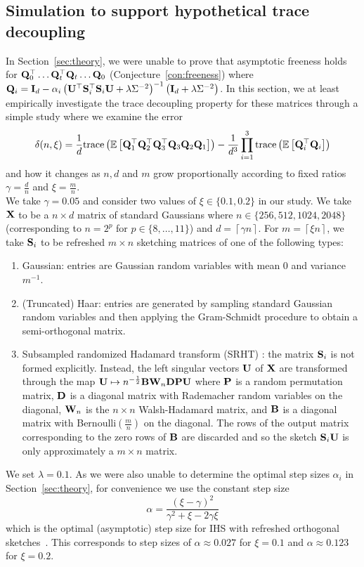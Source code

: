\subsection{Simulation to support hypothetical trace decoupling} \label{sec:empirical}

In Section~\ref{sec:theory}, we were unable to prove that asymptotic freeness holds for $\mathbf{Q}_0^\top\ldots\mathbf{Q}_t^\top\mathbf{Q}_t\ldots\mathbf{Q}_0$ (Conjecture~\ref{con:freeness}) where $\mathbf{Q}_i=\mathbf{I}_d - \alpha_i\left(\mathbf{U}^\top\mathbf{S}_i^\top\mathbf{S}_i\mathbf{U} + \lambda\Sigma^{-2}\right)^{-1}\left(\mathbf{I}_d + \lambda\Sigma^{-2}\right)$. In this section, we at least empirically investigate the trace decoupling property for these matrices through a simple study where we examine the error
\[
\delta(n,\xi) = \frac{1}{d}\mathrm{trace}\left(\mathbb{E}\left[\mathbf{Q}_1^\top\mathbf{Q}_2^\top\mathbf{Q}_3^\top\mathbf{Q}_3\mathbf{Q}_2\mathbf{Q}_1\right]\right) - \frac{1}{d^3}\prod_{i=1}^3\mathrm{trace}\left(\mathbb{E}\left[\mathbf{Q}_i^\top\mathbf{Q}_i\right]\right)
\]
and how it changes as $n,d$ and $m$ grow proportionally according to fixed ratios $\gamma=\frac{d}{n}$ and $\xi=\frac{m}{n}$.
\\

We take $\gamma=0.05$ and consider two values of $\xi\in\{0.1,0.2\}$ in our study. We take $\mathbf{X}$ to be a $n\times d$ matrix of \iid standard Gaussians where $n\in\{256,512,1024,2048\}$ (corresponding to $n=2^p$ for $p\in\{8,\ldots,11\}$) and $d=\left\lceil{\gamma n}\right\rceil$. For $m=\left\lceil{\xi n}\right\rceil$, we take $\mathbf{S}_i$ to be refreshed $m\times n$ sketching matrices of one of the following types:
\begin{enumerate}
\item
\iid Gaussian: entries are \iid Gaussian random variables with mean 0 and variance $m^{-1}$.
\item
(Truncated) Haar: entries are generated by sampling \iid standard Gaussian random variables and then applying the Gram-Schmidt procedure to obtain a semi-orthogonal matrix.
\item
Subsampled randomized Hadamard transform (SRHT) \citep{Lacotte:2020}: the matrix $\mathbf{S}_i$ is not formed explicitly. Instead, the left singular vectors $\mathbf{U}$ of $\mathbf{X}$ are transformed through the map $\mathbf{U}\mapsto n^{-\frac{1}{2}}\mathbf{B}\mathbf{W}_n\mathbf{D}\mathbf{P}\mathbf{U}$ where $\mathbf{P}$ is a random permutation matrix, $\mathbf{D}$ is a diagonal matrix with Rademacher random variables on the diagonal, $\mathbf{W}_n$ is the $n\times n$ Walsh-Hadamard matrix, and $\mathbf{B}$ is a diagonal matrix with Bernoulli$\left(\frac{m}{n}\right)$ on the diagonal. The rows of the output matrix corresponding to the zero rows of $\mathbf{B}$ are discarded and so the sketch $\mathbf{S}_i\mathbf{U}$ is only approximately a $m\times n$ matrix.
\end{enumerate}
We set $\lambda=0.1$. As we were also unable to determine the optimal step sizes $\alpha_i$ in Section~\ref{sec:theory}, for convenience we use the constant step size
\[
\alpha= \frac{(\xi-\gamma)^2}{\gamma^2+\xi-2\gamma\xi}
\]
which is the optimal (asymptotic) step size for IHS with refreshed orthogonal sketches~\citep{Lacotte:2020}. This corresponds to step sizes of $\alpha\approx0.027$ for $\xi=0.1$ and $\alpha\approx0.123$ for $\xi=0.2$.
\\

